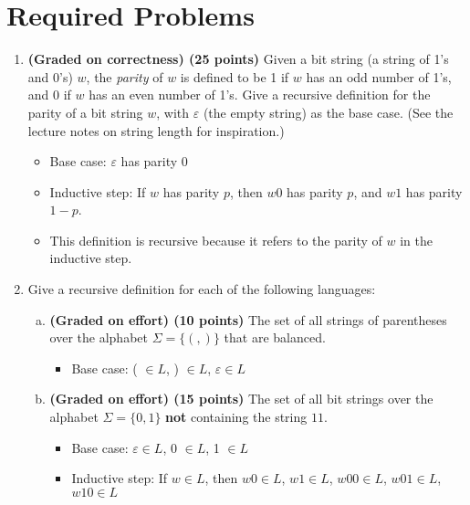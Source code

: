 \documentclass{article}
\theoremstyle{definition}
\newenvironment {solution}
{
\begin{tcolorbox}
}
{
\end{tcolorbox}
}
\begin{document}
\section{Required Problems}
\begin{enumerate}
    \item \textbf{(Graded on correctness) (25 points)} Given a bit string (a string of 1's and 0's) $w$, the \emph{parity} of $w$ is defined to be 1 if $w$ has an odd number of 1's, and 0 if $w$ has an even number of 1's. Give a recursive definition for the parity of a bit string $w$, with $\varepsilon$ (the empty string) as the base case. (See the lecture notes on string length for inspiration.)
    \begin{itemize}
        \item Base case: $\varepsilon$ has parity 0
        \item Inductive step: If $w$ has parity $p$, then $w0$ has parity $p$, and $w1$ has parity $1-p$.
        \item This definition is recursive because it refers to the parity of $w$ in the inductive step.
    \end{itemize}
    \item Give a recursive definition for each of the following languages:
    \begin{enumerate}[(a)]
        \item \textbf{(Graded on effort) (10 points)} The set of all strings of parentheses over the alphabet $\Sigma = \{(, )\}$ that are balanced.
            \begin{solution}
                \begin{itemize}
                    \item Base case: ( $\in L$, ) $\in L$, $\varepsilon \in L$
                    
                \end{itemize}
		\end{solution}
        \item \textbf{(Graded on effort) (15 points)} The set of all bit strings over the alphabet $\Sigma = \{0, 1\}$ \textbf{not} containing the string $11$.
 		\begin{solution}
	      \begin{itemize}
            \item Base case: $\varepsilon \in L$, 0 $\in L$, 1 $\in L$
            \item Inductive step: If $w \in L$, then $w0 \in L$, $w1 \in L$, $w00 \in L$, $w01 \in L$, $w10 \in L$
          \end{itemize}
		\end{solution}
    \end{enumerate}


\end{enumerate}
\end{document}
